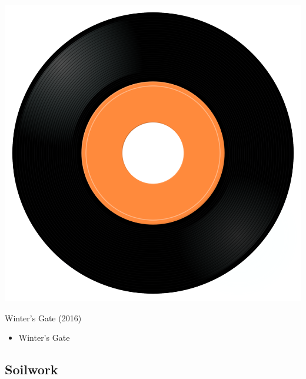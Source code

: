 \begin{minipage}[t]{0.25\textwidth}\vspace{0pt}
\captionsetup{type=figure}
\includegraphics[width=\textwidth]{Images/cover.png}
\caption*{Winter's Gate (2016)}
\end{minipage}
\begin{minipage}[t]{0.25\textwidth}\vspace{0pt}
\begin{itemize}[nosep,leftmargin=1em,labelwidth=*,align=left]
	\setlength{\itemsep}{0pt}
	\item Winter's Gate
\end{itemize}
\end{minipage}

\subsection{Soilwork}

